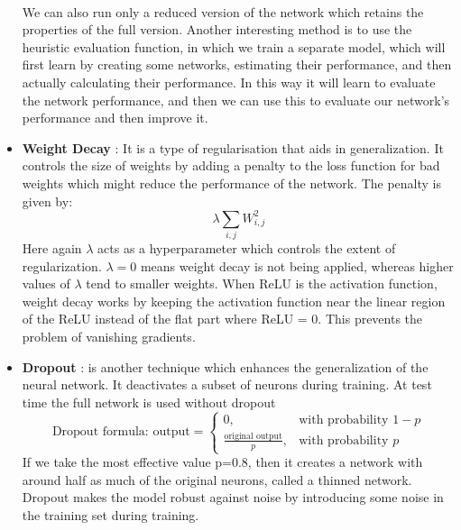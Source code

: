 \documentclass{article}
\begin{document}
\begin{itemize}
          \paragraph{} We can also run only a reduced version of the network which retains the properties of the full version. Another interesting method is to use the heuristic evaluation function, in which we train a separate model, which will first learn by creating some networks, estimating their performance, and then actually calculating their performance. In this way it will learn to evaluate the network performance, and then we can use this to evaluate our network’s performance and then improve it.
        \item \textbf{Weight Decay} : It is a type of regularisation that aids in generalization. It controls the size of weights by adding a penalty to the loss function for bad weights which might reduce the performance of the network. The penalty is given by: 
          \begin{equation*}
            \lambda \sum_{i,j} W_{i,j}^2
          \end{equation*}
          Here again $\lambda$ acts as a hyperparameter which controls the extent of regularization. $\lambda = 0$ means weight decay is not being applied, whereas higher values of $\lambda$ tend to smaller weights. When ReLU is the activation function, weight decay works by keeping the activation function near the linear region of the ReLU instead of the flat part where ReLU = 0. This prevents the problem of vanishing gradients.

        \item \textbf{Dropout} : is another technique which enhances the generalization of the neural network. It deactivates a subset of neurons during training. At test time the full network is used without dropout
            \begin{equation*}
              \text{Dropout formula: output} = \begin{cases} 0, & \text{with probability } 1-p \\ \frac{\text{original output}}{p}, & \text{with probability } p \end{cases}
            \end{equation*}
            If we take the most effective value p=0.8, then it creates a network with around half as much of the original neurons, called a thinned network. Dropout makes the model robust against noise by introducing some noise in the training set during training. 
        \end{itemize}
\end{document}
